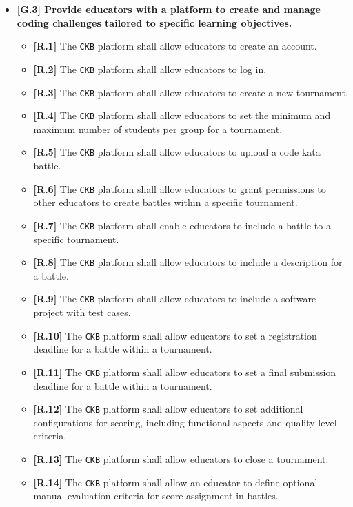 \begin{itemize}
        \item \textbf{{[G.3]} Provide educators with a platform to create and manage coding challenges tailored to specific learning objectives. }
        \begin{itemize}
            \item \textbf{[R.1]} The \verb|CKB| platform shall allow educators to create an account.
            \item \textbf{[R.2]} The \verb|CKB| platform shall allow educators to log in. 
            \item \textbf{[R.3]} The \verb|CKB| platform shall allow educators to create a new tournament.
            \item \textbf{[R.4]} The \verb|CKB| platform shall allow educators to set the minimum and maximum number of students per group for a tournament.
            \item \textbf{[R.5]} The \verb|CKB| platform shall allow educators to upload a code kata battle.
            \item \textbf{[R.6]} The \verb|CKB| platform shall allow educators to grant permissions to other educators to create battles within a specific tournament.
            \item \textbf{[R.7]} The \verb|CKB| platform shall enable educators to include a battle to a specific tournament. 
            \item \textbf{[R.8]} The \verb|CKB| platform shall allow educators to include a description for a battle.
            \item \textbf{[R.9]} The \verb|CKB| platform shall allow educators to include a software project with test cases.  
            \item \textbf{[R.10]} The \verb|CKB| platform shall allow educators to set a registration deadline for a battle within a tournament.
            \item \textbf{[R.11]} The \verb|CKB| platform shall allow educators to set a final submission deadline for a battle within a tournament.
            \item \textbf{[R.12]} The \verb|CKB| platform shall allow educators to set additional configurations for scoring, including functional aspects and quality level criteria.
            \item \textbf{[R.13]} The \verb|CKB| platform shall allow educators to close a tournament. 
            \item \textbf{[R.14]} The \verb|CKB| platform shall allow an educator to define optional manual evaluation criteria for score assignment in battles.

\end{itemize}
\end{itemize}
